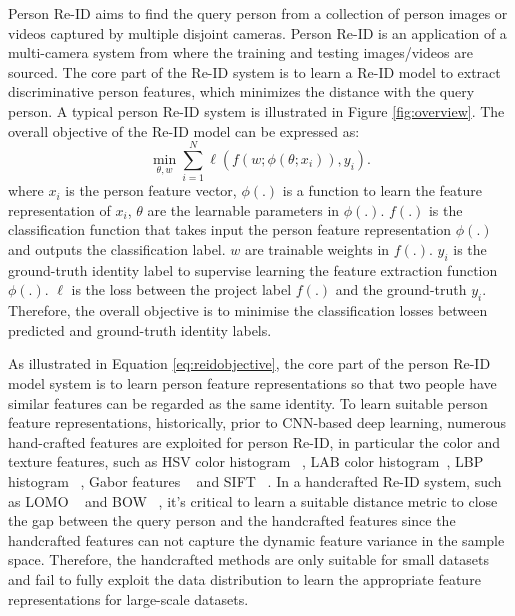 \documentclass[a4paper,fleqn]{cas-dc}
\begin{document}
Person Re-ID aims to find the query person from a collection of person images or videos captured by multiple disjoint cameras. Person Re-ID is an application of a multi-camera system from where the training and testing images/videos are sourced. The core part of the Re-ID system is to learn a Re-ID model to extract discriminative person features, which minimizes the distance with the query person. A typical person Re-ID system is illustrated in Figure \ref{fig:overview}. The overall objective of the Re-ID model can be expressed as:
\begin{equation}
\label{eq:reidobjective}
\min_{\theta,w} \sum_{i=1}^N \ell(f(w;\phi(\theta;x_i)),y_i).
\end{equation}
where $x_i$ is the person feature vector, $\phi(.)$ is a function to learn the feature representation of $x_i$, $\theta$ are the learnable parameters in $\phi(.)$. $f(.)$ is the classification function that takes input the person feature representation $\phi(.)$ and outputs the classification label. $w$ are trainable weights in $f(.)$. $y_i$ is the ground-truth identity label to supervise learning the feature extraction function $\phi(.)$. $\ell$ is the loss between the project label $f(.)$ and the ground-truth $y_i$. Therefore, the overall objective is to minimise the classification losses between predicted and ground-truth identity labels.

As illustrated in Equation \ref{eq:reidobjective}, the core part of the person Re-ID model system is to learn person feature representations so that two people have similar features can be regarded as the same identity. To learn suitable person feature representations, historically, prior to CNN-based deep learning, numerous hand-crafted features are exploited for person Re-ID, in particular the color and texture features, such as HSV color histogram ~\cite{farenzena_person_2010,li_locally_2013}, LAB color histogram~\cite{zhao_unsupervised_2013}, LBP histogram ~\cite{li_locally_2013}, Gabor features ~\cite{li_locally_2013} and SIFT ~\cite{zhao_unsupervised_2013}. In a handcrafted Re-ID system, such as LOMO ~\cite{liao_person_2015} and BOW ~\cite{zheng_scalable_2015}, it's critical to learn a suitable distance metric to close the gap between the query person and the handcrafted features since the handcrafted features can not capture the dynamic feature variance in the sample space. Therefore, the handcrafted methods are only suitable for small datasets and fail to fully exploit the data distribution to learn the appropriate feature representations for large-scale datasets.
\end{document}
